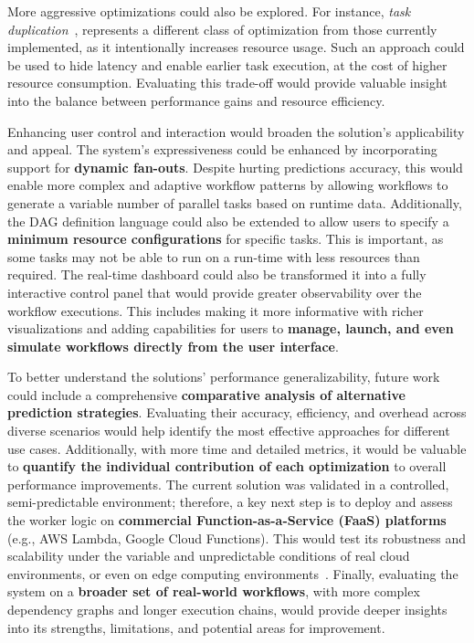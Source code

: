 More aggressive optimizations could also be explored. For instance, \textit{task duplication}~\cite{task_duplication_scheduling}, represents a different class of optimization from those currently implemented, as it intentionally increases resource usage. Such an approach could be used to hide latency and enable earlier task execution, at the cost of higher resource consumption. Evaluating this trade-off would provide valuable insight into the balance between performance gains and resource efficiency.

Enhancing user control and interaction would broaden the solution's applicability and appeal. The system's expressiveness could be enhanced by incorporating support for \textbf{dynamic fan-outs}. Despite hurting predictions accuracy, this would enable more complex and adaptive workflow patterns by allowing workflows to generate a variable number of parallel tasks based on runtime data. Additionally, the DAG definition language could also be extended to allow users to specify a \textbf{minimum resource configurations} for specific tasks. This is important, as some tasks may not be able to run on a run-time with less resources than required. The real-time dashboard could also be transformed it into a fully interactive control panel that would provide greater observability over the workflow executions. This includes making it more informative with richer visualizations and adding capabilities for users to \textbf{manage, launch, and even simulate workflows directly from the user interface}.

To better understand the solutions' performance generalizability, future work could include a comprehensive \textbf{comparative analysis of alternative prediction strategies}. Evaluating their accuracy, efficiency, and overhead across diverse scenarios would help identify the most effective approaches for different use cases. Additionally, with more time and detailed metrics, it would be valuable to \textbf{quantify the individual contribution of each optimization} to overall performance improvements. The current solution was validated in a controlled, semi-predictable environment; therefore, a key next step is to deploy and assess the worker logic on \textbf{commercial Function-as-a-Service (FaaS) platforms} (e.g., AWS Lambda, Google Cloud Functions). This would test its robustness and scalability under the variable and unpredictable conditions of real cloud environments, or even on edge computing environments~\cite{cluster-comp-19,comp-nets-22}. Finally, evaluating the system on a \textbf{broader set of real-world workflows}, with more complex dependency graphs and longer execution chains, would provide deeper insights into its strengths, limitations, and potential areas for improvement.
